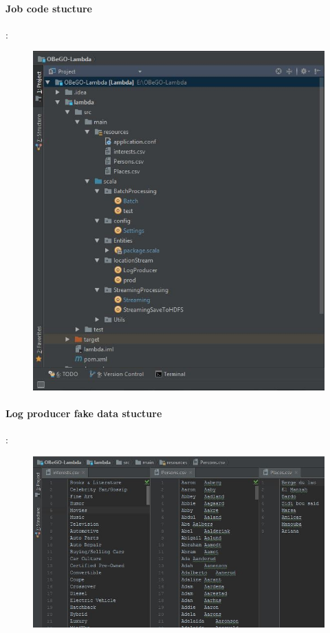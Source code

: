 \paragraph{Job code stucture} :
\begin{figure}[h!]
	\centering
	\includegraphics[height=0.4\textheight]{JobsCode}
	\label{fig:FilialesEtClients}
\end{figure}
\paragraph{Log producer fake data stucture} :
\begin{figure}[h!]
	\centering
	\includegraphics[height=0.3\textheight]{LogProducerFakeData}
	\label{fig:FilialesEtClients}
\end{figure}
\newpage
